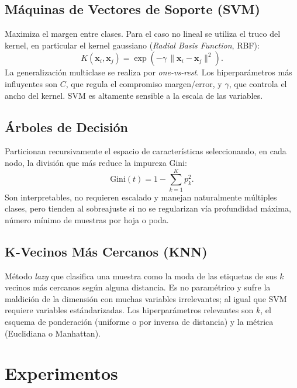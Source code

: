 \documentclass[conference]{IEEEtran}
\begin{document}
\subsection{M\'aquinas de Vectores de Soporte (SVM)}
Maximiza el margen entre clases. Para el caso no lineal se utiliza el truco del kernel, en particular el kernel gaussiano (\emph{Radial Basis Function}, RBF):
\begin{equation}
K(\mathbf{x}_i, \mathbf{x}_j) = \exp\left(-\gamma\, \|\mathbf{x}_i - \mathbf{x}_j\|^2\right).
\end{equation}
La generalizaci\'on multiclase se realiza por \emph{one-vs-rest}. Los hiperpar\'ametros m\'as influyentes son $C$, que regula el compromiso margen/error, y $\gamma$, que controla el ancho del kernel. SVM es altamente sensible a la escala de las variables.

\subsection{\'Arboles de Decisi\'on}
Particionan recursivamente el espacio de caracter\'isticas seleccionando, en cada nodo, la divisi\'on que m\'as reduce la impureza Gini:
\begin{equation}
\text{Gini}(t) = 1 - \sum_{k=1}^{K} p_k^2.
\end{equation}
Son interpretables, no requieren escalado y manejan naturalmente m\'ultiples clases, pero tienden al sobreajuste si no se regularizan v\'ia profundidad m\'axima, n\'umero m\'inimo de muestras por hoja o poda.

\subsection{K-Vecinos M\'as Cercanos (KNN)}
M\'etodo \emph{lazy} que clasifica una muestra como la moda de las etiquetas de sus $k$ vecinos m\'as cercanos seg\'un alguna distancia. Es no param\'etrico y sufre la maldici\'on de la dimensi\'on con muchas variables irrelevantes; al igual que SVM requiere variables est\'andarizadas. Los hiperpar\'ametros relevantes son $k$, el esquema de ponderaci\'on (uniforme o por inversa de distancia) y la m\'etrica (Euclidiana o Manhattan).

\section{Experimentos}
\end{document}
